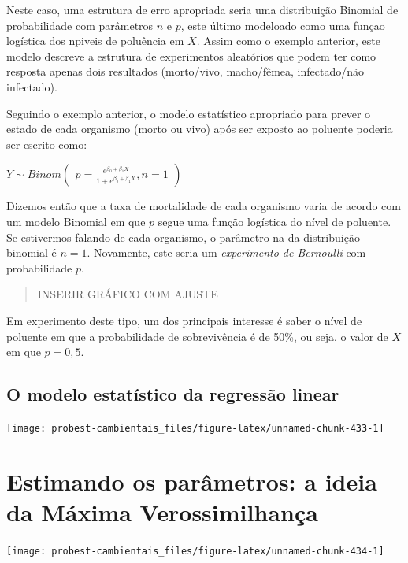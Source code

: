 \documentclass[
]{book}
\begin{document}
Neste caso, uma estrutura de erro apropriada seria uma distribuição Binomial de probabilidade com parâmetros \(n\) e \(p\), este último modeloado como uma funçao logística dos npiveis de poluência em \(X\). Assim como o exemplo anterior, este modelo descreve a estrutura de experimentos aleatórios que podem ter como resposta apenas dois resultados (morto/vivo, macho/fêmea, infectado/não infectado).

Seguindo o exemplo anterior, o modelo estatístico apropriado para prever o estado de cada organismo (morto ou vivo) após ser exposto ao poluente poderia ser escrito como:

\(Y ∼ Binom \left (\begin{array}{c} p = \frac{e^{\beta_0 + \beta_1 X}}{1 + e^{\beta_0 + \beta_1 X}}, n = 1 \end{array}\right)\)

Dizemos então que a taxa de mortalidade de cada organismo varia de acordo com um modelo Binomial em que \(p\) segue uma função logística do nível de poluente. Se estivermos falando de cada organismo, o parâmetro na da distribuição binomial é \(n = 1\). Novamente, este seria um \emph{experimento de Bernoulli} com probabilidade \(p\).

\begin{quote}
INSERIR GRÁFICO COM AJUSTE
\end{quote}

Em experimento deste tipo, um dos principais interesse é saber o nível de poluente em que a probabilidade de sobrevivência é de 50\%, ou seja, o valor de \(X\) em que \(p = 0,5\).

\hypertarget{o-modelo-estatuxedstico-da-regressuxe3o-linear}{%
\section{O modelo estatístico da regressão linear}\label{o-modelo-estatuxedstico-da-regressuxe3o-linear}}

\begin{center}\texttt{[image: probest-cambientais\_files/figure-latex/unnamed-chunk-433-1]} \end{center}

\hypertarget{emv}{%
\chapter{Estimando os parâmetros: a ideia da Máxima Verossimilhança}\label{emv}}

\begin{center}\texttt{[image: probest-cambientais\_files/figure-latex/unnamed-chunk-434-1]} \end{center}
\end{document}
